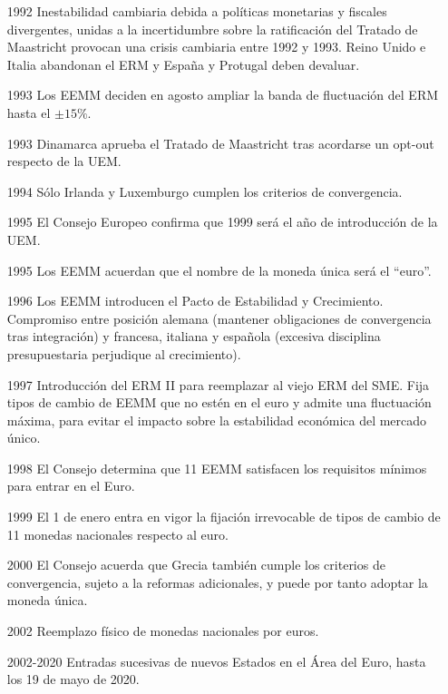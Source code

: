 \documentclass{nuevotema}
\begin{document}
\begin{itemize}
	\item[1992] Inestabilidad cambiaria debida a políticas monetarias y fiscales divergentes, unidas a la incertidumbre sobre la ratificación del Tratado de Maastricht provocan una crisis cambiaria entre 1992 y 1993. Reino Unido e Italia abandonan el ERM y España y Protugal deben devaluar.
	\item[1993] Los EEMM deciden en agosto ampliar la banda de fluctuación del ERM hasta el $\pm 15\%$. 
	\item[1993] Dinamarca aprueba el Tratado de Maastricht tras acordarse un opt-out respecto de la UEM.
	\item[1994] Sólo Irlanda y Luxemburgo cumplen los criterios de convergencia.
	\item[1995] El Consejo Europeo confirma que 1999 será el año de introducción de la UEM.
	\item[1995] Los EEMM acuerdan que el nombre de la moneda única será el ``euro''.
	\item[1996] Los EEMM introducen el Pacto de Estabilidad y Crecimiento. Compromiso entre posición alemana (mantener obligaciones de convergencia tras integración) y francesa, italiana y española (excesiva disciplina presupuestaria perjudique al crecimiento).
	\item[1997] Introducción del ERM II para reemplazar al viejo ERM del SME. Fija tipos de cambio de EEMM que no estén en el euro y admite una fluctuación máxima, para evitar el impacto sobre la estabilidad económica del mercado único. 
	\item[1998] El Consejo determina que 11 EEMM satisfacen los requisitos mínimos para entrar en el Euro.
	\item[1999] El 1 de enero entra en vigor la fijación irrevocable de tipos de cambio de 11 monedas nacionales respecto al euro. 
	\item[2000] El Consejo acuerda que Grecia también cumple los criterios de convergencia, sujeto a la reformas adicionales, y puede por tanto adoptar la moneda única. 
	\item[2002] Reemplazo físico de monedas nacionales por euros.
	\item[2002-2020] Entradas sucesivas de nuevos Estados en el Área del Euro, hasta los 19 de mayo de 2020.
\end{itemize}
\end{document}
